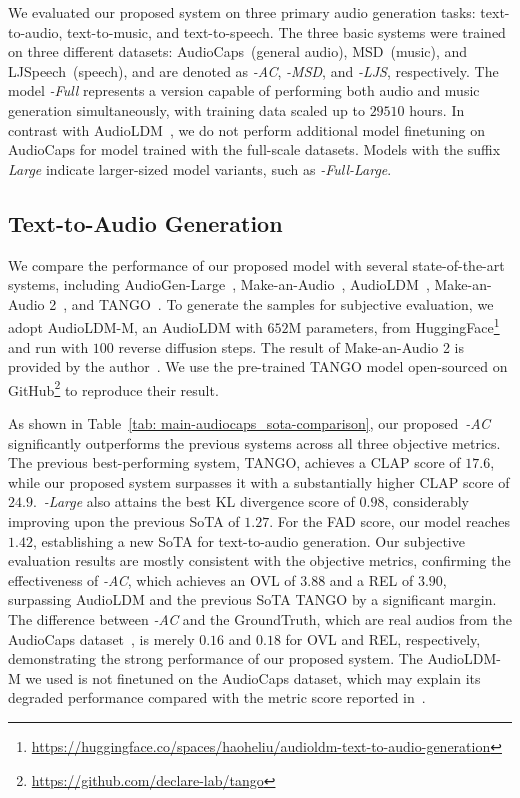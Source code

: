 \documentclass[lettersize,journal]{IEEEtran}
\begin{document}
\noindent
We evaluated our proposed system on three primary audio generation tasks: text-to-audio, text-to-music, and text-to-speech. The three basic systems were trained on three different datasets: AudioCaps~(general audio), MSD~(music), and LJSpeech~(speech), and are denoted as \vModelName\textit{-AC}, \vModelName\textit{-MSD}, and \vModelName\textit{-LJS}, respectively. The model \vModelName\textit{-Full} represents a version capable of performing both audio and music generation simultaneously, with training data scaled up to $29510$ hours. In contrast with AudioLDM~\cite{liu2023audioldm}, we do not perform additional model finetuning on AudioCaps for model trained with the full-scale datasets. Models with the suffix \textit{Large} indicate larger-sized model variants, such as \vModelName\textit{-Full-Large}. 







\subsection{Text-to-Audio Generation}
\noindent
We compare the performance of our proposed model with several state-of-the-art systems, including AudioGen-Large~\cite{kreuk2022audiogen}, Make-an-Audio~\cite{huang2023make-an-audio}, AudioLDM~\cite{liu2023audioldm}, Make-an-Audio 2~\cite{huang2023make-an-audio-2}, and TANGO~\cite{ghosal2023text-tango}. To generate the samples for subjective evaluation, we adopt AudioLDM-M, an AudioLDM with $652$M parameters, from HuggingFace\footnote{\url{https://huggingface.co/spaces/haoheliu/audioldm-text-to-audio-generation}} and run with $100$ reverse diffusion steps. 
The result of Make-an-Audio 2 is provided by the author~\cite{huang2023make-an-audio-2}. We use the pre-trained TANGO model open-sourced on GitHub\footnote{\url{https://github.com/declare-lab/tango}} to reproduce their result. 

As shown in Table~\ref{tab: main-audiocaps_sota-comparison}, our proposed~\vModelName\textit{-AC} significantly outperforms the previous systems across all three objective metrics. The previous best-performing system, TANGO, achieves a CLAP score of $17.6$, while our proposed system surpasses it with a substantially higher CLAP score of $24.9$.~\vModelName\textit{-Large} also attains the best KL divergence score of $0.98$, considerably improving upon the previous SoTA of $1.27$. 
For the FAD score, our model reaches $1.42$, establishing a new SoTA for text-to-audio generation. Our subjective evaluation results are mostly consistent with the objective metrics, confirming the effectiveness of \vModelName\textit{-AC}, which achieves an OVL of $3.88$ and a REL of $3.90$, surpassing AudioLDM and the previous SoTA TANGO by a significant margin. The difference between \vModelName\textit{-AC} and the GroundTruth, which are real audios from the AudioCaps dataset~\cite{kim2019audiocaps}, is merely $0.16$ and $0.18$ for OVL and REL, respectively, demonstrating the strong performance of our proposed system.
The AudioLDM-M we used is not finetuned on the AudioCaps dataset, which may explain its degraded performance compared with the metric score reported in~\cite{liu2023audioldm}. 
\end{document}
